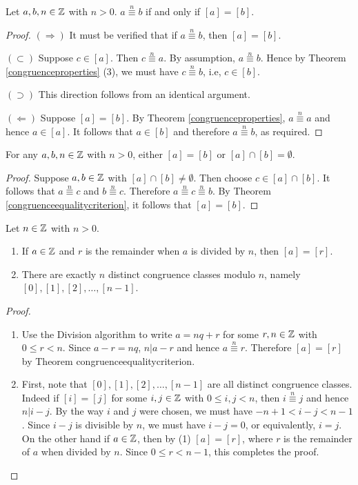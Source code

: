 \documentclass[11pt,fleqn,dvipsnames,usenames]{article}
\begin{document}
%
\begin{theorem}\label{congruenceequalitycriterion}
Let $a,b,n\in\mathbb{Z}$ with $n > 0$.  $a\overset{n}{\equiv}b$ if and only if $[a] = [b]$.
\end{theorem}
%
\begin{proof}
$(\Rightarrow)$ It must be verified that if $a\overset{n}{\equiv}b$, then $[a] = [b]$.

$(\subset)$ Suppose $c\in[a]$.  Then $c\overset{n}{\equiv}a$.  By assumption, $a\overset{n}{\equiv}b$.  Hence by Theorem \ref{congruenceproperties} (3), we must have $c\overset{n}{\equiv}b$, i.e, $c\in[b]$.

$(\supset)$ This direction follows from an identical argument.

$(\Leftarrow)$ Suppose $[a] = [b]$.  By Theorem \ref{congruenceproperties}, $a\overset{n}{\equiv}a$ and hence $a\in [a]$.  It follows that $a\in[b]$ and therefore $a\overset{n}{\equiv}b$, as required.
\end{proof}
%
\begin{corollary}\label{disjointorsame}
For any $a,b,n\in\mathbb{Z}$ with $n > 0$, either $[a] = [b]$ or $[a]\cap [b] = \emptyset$.
\end{corollary}
%
\begin{proof}
Suppose $a,b\in\mathbb{Z}$ with $[a]\cap[b]\neq\emptyset$.  Then choose $c\in[a]\cap[b]$.  It follows that $a\overset{n}{\equiv}c$ and $b\overset{n}{\equiv}c$.  Therefore $a\overset{n}{\equiv}c\overset{n}{\equiv}b$.  By Theorem \ref{congruenceequalitycriterion}, it follows that $[a] = [b]$.
\end{proof}
%
\begin{corollary}\label{elementsofZn}
Let $n\in\mathbb{Z}$ with $n>0$.
\begin{enumerate}[(1)]
\item If $a\in\mathbb{Z}$ and $r$ is the remainder when $a$ is divided by $n$, then $[a] = [r]$.
\item There are exactly $n$ distinct congruence classes modulo $n$, namely $[0], [1], [2],\ldots, [n-1]$.
\end{enumerate}
\end{corollary}
%
\begin{proof}~
\begin{enumerate}[(1)]
\item Use the Division algorithm to write $a = nq + r$ for some $r,n\in\mathbb{Z}$ with $0\leq r < n$.  Since $a - r = nq$, $n|a-r$ and hence $a\overset{n}{\equiv}r$.  Therefore $[a] = [r]$ by Theorem {congruenceequalitycriterion}.
\item First, note that $[0], [1], [2],\ldots, [n-1]$ are all distinct congruence classes.  Indeed if $[i] = [j]$ for some $i,j\in\mathbb{Z}$ with $0\leq i,j < n$, then $i\overset{n}{\equiv}j$ and hence $n|i-j$.  By the way $i$ and $j$ were chosen, we must have $-n+1 < i-j < n-1$.  Since $i-j$ is divisible by $n$, we must have $i-j = 0$, or equivalently, $i=j$.  On the other hand if $a\in\mathbb{Z}$, then by (1) $[a] = [r]$, where $r$ is the remainder of $a$ when divided by $n$.  Since $0\leq r < n-1$, this completes the proof.\qedhere
\end{enumerate}
\end{proof}
\end{document}
